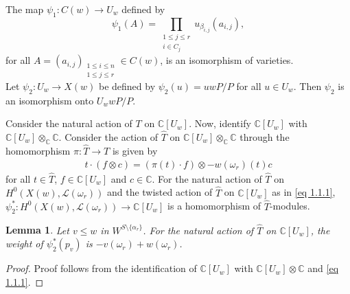 \documentclass[12pt,reqno]{amsart}
\numberwithin{equation}{section}
\newtheorem{lemma}[theorem]{Lemma}
\theoremstyle{definition}
\begin{document}
The map $\psi_{1}:C(w)\longrightarrow U_{w}$ defined by $$\psi_{1}(A)=\displaystyle\prod_{\substack{1\leq j\leq r\\i\in C_{j}}}u_{\beta_{i,j}}(a_{i,j}),$$ for all $A=(a_{i,j})_{\substack{1\leq i\leq n\\ 1\leq j\leq r}}\in C(w)$, 
is an isomorphism of varieties. \\
Let $\psi_{2}:U_{w}\longrightarrow X(w)$ 
be defined by $\psi_{2}(u)=uwP/P$ for all $u\in U_{w}$. Then $\psi_{2}$ is an isomorphism onto $U_{w}wP/P$. 

Consider the natural action of $T$ on $\mathbb{C}[U_{w}]$. Now,
identify $\mathbb{C}[U_{w}]$ with $\mathbb{C}[U_{w}]\otimes_{\mathbb{C}}\mathbb{C}$. Consider the action of $\hat{T}$ on $\mathbb{C}[U_{w}]\otimes_{\mathbb{C}}\mathbb{C}$ through the homomorphism $\pi:\hat{T}\longrightarrow T$ is given by \begin{align}\label{eq 1.1.1}
	t\cdot (f\otimes c)=(\pi(t)\cdot f)\otimes-w(\omega_{r})(t)c
\end{align}
for all $t\in \hat{T}$, $f\in\mathbb{C}[U_{w}]$ and $c\in\mathbb{C}$.
For the natural action of $\hat{T}$ on $H^{0}(X(w),\mathcal{L}(\omega_{r}))$ and the twisted action of $\hat{T}$ on $\mathbb{C}[U_{w}]$ as in \cref{eq 1.1.1}, $\psi_{2}^{*}:H^{0}(X(w),\mathcal{L}(\omega_{r}))\longrightarrow\mathbb{C}[U_{w}]$ is a homomorphism of $\hat{T}$-modules.
\begin{lemma}\label{remark 1.2}Let $v\leq w$ in $W^{S\setminus\{\alpha_{r}\}}$. For the natural action of $\hat{T}$ on $\mathbb{C}[U_{w}]$, the weight of $\psi_{2}^{*}(p_{v})$ is $-v(\omega_{r})+w({\omega_{r}})$.
\end{lemma}
	\begin{proof}
	  Proof follows from the identification of $\mathbb{C}[U_{w}]$ with $\mathbb{C}[U_{w}]\otimes\mathbb{C}$ and \cref{eq 1.1.1}.
	\end{proof}
\end{document}
